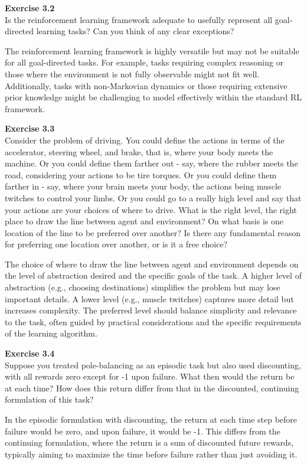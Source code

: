 \documentclass[addpoints]{exam}
\begin{document}
\begin{questions}
    \question
    \textbf{Exercise 3.2} \\ Is the reinforcement learning framework adequate to usefully represent all goal-directed learning tasks? Can you think of any clear exceptions?
    \begin{solution}
        The reinforcement learning framework is highly versatile but may not be suitable for all goal-directed tasks. For example, tasks requiring complex reasoning or those where the environment is not fully observable might not fit well. Additionally, tasks with non-Markovian dynamics or those requiring extensive prior knowledge might be challenging to model effectively within the standard RL framework.
    \end{solution}

    \question
    \textbf{Exercise 3.3} \\ Consider the problem of driving. You could define the actions in terms of the accelerator, steering wheel, and brake, that is, where your body meets the machine. Or you could define them farther out - say, where the rubber meets the road, considering your actions to be tire torques. Or you could define them farther in - say, where your brain meets your body, the actions being muscle twitches to control your limbs. Or you could go to a really high level and say that your actions are your choices of where to drive. What is the right level, the right place to draw the line between agent and environment? On what basis is one location of the line to be preferred over another? Is there any fundamental reason for preferring one location over another, or is it a free choice?
    \begin{solution}
        The choice of where to draw the line between agent and environment depends on the level of abstraction desired and the specific goals of the task. A higher level of abstraction (e.g., choosing destinations) simplifies the problem but may lose important details. A lower level (e.g., muscle twitches) captures more detail but increases complexity. The preferred level should balance simplicity and relevance to the task, often guided by practical considerations and the specific requirements of the learning algorithm.
    \end{solution}

    \question
    \textbf{Exercise 3.4} \\ Suppose you treated pole-balancing as an episodic task but also used discounting, with all rewards zero except for -1 upon failure. What then would the return be at each time? How does this return differ from that in the discounted, continuing formulation of this task?
    \begin{solution}
        In the episodic formulation with discounting, the return at each time step before failure would be zero, and upon failure, it would be -1. This differs from the continuing formulation, where the return is a sum of discounted future rewards, typically aiming to maximize the time before failure rather than just avoiding it.
    \end{solution}


\end{questions}
\end{document}
